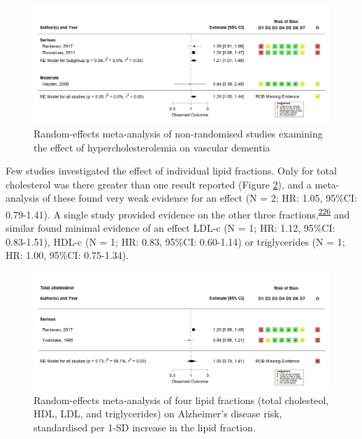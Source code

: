 \documentclass[a4paper, twoside]{templates/ociamthesis}
\begin{document}
\begin{figure}[H]
\includegraphics[width=1\linewidth]{figures/sys-rev/fp_obs_hyperchol_VaD} \caption[Meta-analysis of hypercholesterolemia on vascular dementia]{Random-effects meta-analysis of non-randomised studies examining the effect of hypercholesterolemia on vascular dementia}\label{fig:obsHyperVaD}
\end{figure}

Few studies investigated the effect of individual lipid fractions. Only for total cholesterol was there greater than one result reported (Figure \ref{fig:lipidFractionsVaD}), and a meta-analysis of these found very weak evidence for an effect (N = 2; HR: 1.05, 95\%CI: 0.79-1.41). A single study provided evidence on the other three fractions,\textsuperscript{\protect\hyperlink{ref-yoshitake1995}{226}} and similar found minimal evidence of an effect LDL-c (N = 1; HR: 1.12, 95\%CI: 0.83-1.51), HDL-c (N = 1; HR: 0.83, 95\%CI: 0.60-1.14) or triglycerides (N = 1; HR: 1.00, 95\%CI: 0.75-1.34).





\begin{figure}[H]
\includegraphics[width=1\linewidth]{figures/sys-rev/fp_obs_VaD_TC_} \caption[Random-effects meta-analysis of four lipid fractions on Alzheimer's disease]{Random-effects meta-analysis of four lipid fractions (total cholesteol, HDL, LDL, and triglycerides) on Alzheimer's disease risk, standardised per 1-SD increase in the lipid fraction.}\label{fig:lipidFractionsVaD}
\end{figure}
\end{document}
